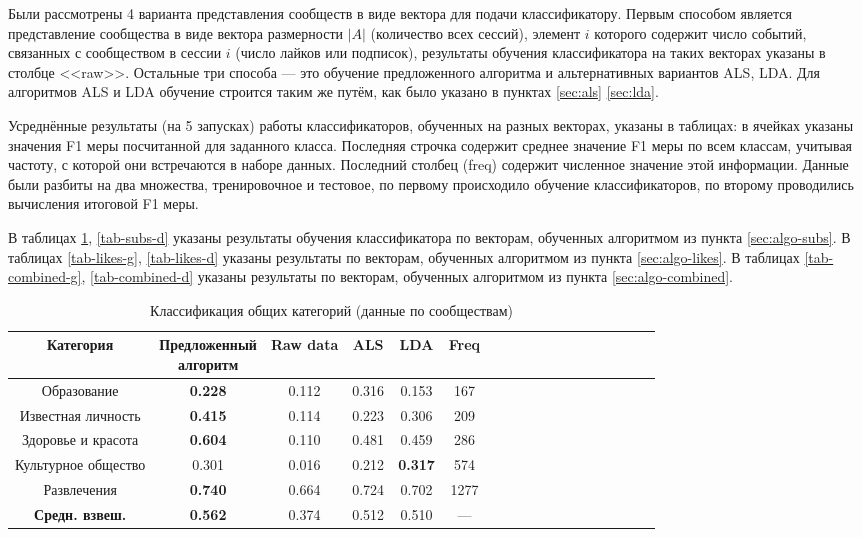 \documentclass[times,specification,annotation]{itmo-student-thesis}
\begin{document}
Были рассмотрены 4 варианта представления сообществ в виде вектора для подачи классификатору. Первым способом является представление сообщества в виде вектора размерности $|A|$ (количество всех сессий), элемент $i$ которого содержит число событий, связанных с сообществом в сессии $i$ (число лайков или подписок), результаты обучения классификатора на таких векторах указаны в столбце <<raw>>. Остальные три способа --- это обучение предложенного алгоритма и альтернативных вариантов ALS, LDA. Для алгоритмов ALS и LDA обучение строится таким же путём, как было указано в пунктах \ref{sec:als} \ref{sec:lda}.  

Усреднённые результаты (на 5 запусках) работы классификаторов, обученных на разных векторах, указаны в таблицах: в ячейках указаны значения F1 меры посчитанной для заданного класса. Последняя строчка содержит среднее значение F1 меры по всем классам, учитывая частоту, с которой они встречаются в наборе данных. Последний столбец (freq) содержит численное значение этой информации. Данные были разбиты на два множества, тренировочное и тестовое, по первому происходило обучение классификаторов, по второму проводились вычисления итоговой F1 меры.

В таблицах \ref{tab-subs-g}, \ref{tab-subs-d} указаны результаты обучения классификатора по векторам, обученных алгоритмом из пункта \ref{sec:algo-subs}. В таблицах \ref{tab-likes-g}, \ref{tab-likes-d} указаны результаты по векторам, обученных алгоритмом из пункта \ref{sec:algo-likes}. В таблицах \ref{tab-combined-g}, \ref{tab-combined-d} указаны результаты по векторам, обученных алгоритмом из пункта \ref{sec:algo-combined}. 

\begin{table}[!h]
\caption{Классификация общих категорий (данные по сообществам)}\label{tab-subs-g}
\centering
\begin{tabular}{|*{18}{c|}}\hline
    Категория & \thead{Предложенный \\ алгоритм}  & Raw data & ALS & LDA & Freq \\\hline
Образование     & \textbf{0.228} & 0.112 & 0.316 & 0.153 & 167 \\\hline
Известная личность             & \textbf{0.415} & 0.114 & 0.223 & 0.306 & 209 \\\hline
Здоровье и красота             & \textbf{0.604} & 0.110 & 0.481 & 0.459 & 286 \\\hline
Культурное общество         & 0.301 & 0.016 & 0.212 & \textbf{0.317} & 574  \\\hline
Развлечения                           & \textbf{0.740} & 0.664 & 0.724 & 0.702 & 1277 \\\hline
\textbf{Средн. взвеш.}      & \textbf{0.562} & 0.374 & 0.512 & 0.510 & --- \\\hline
\end{tabular}
\end{table}
\end{document}
